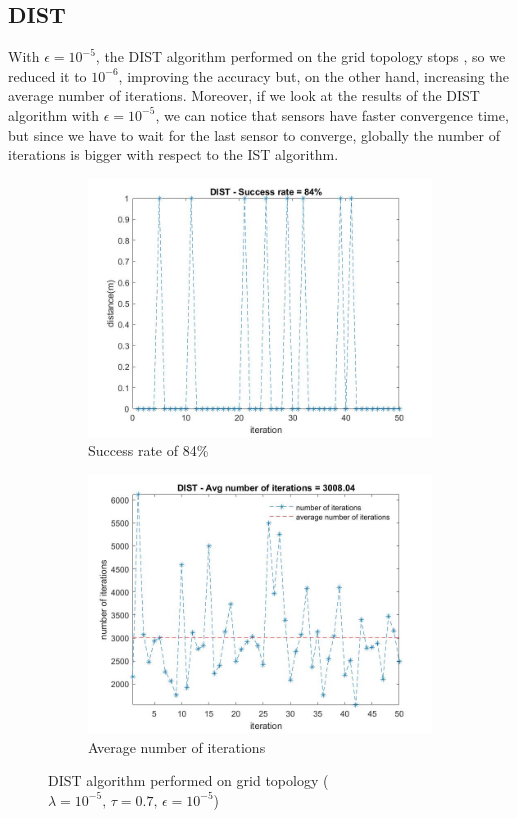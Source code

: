 \subsection{DIST}

With $\epsilon=10^{-5}$, the DIST algorithm performed on the grid topology stops , so we reduced it to $10^{-6}$, improving the accuracy
but, on the other hand, increasing the average number of iterations. Moreover, if we look at the results of 
the DIST algorithm with $\epsilon=10^{-5}$, we can notice that sensors have faster convergence time, but since we have to wait 
for the last sensor to converge, globally the number of iterations is bigger with respect to the IST algorithm.

\begin{figure}[H]
    \begin{subfigure}{0.45\textwidth}
        \centering
        \includegraphics[width=\textwidth]{img/DIST_distance_1e-4_grid.jpg}
        \caption{Success rate of 84\%}
    \end{subfigure}
    \hfill
    \begin{subfigure}{0.45\textwidth}
        \centering
        \includegraphics[width=\textwidth]{img/DIST_num_iterations_1e-4_grid.jpg}
        \caption{Average number of iterations}
    \end{subfigure}
    \caption{DIST algorithm performed on grid topology ($\lambda=10^{-5},\,\tau=0.7,\,\epsilon=10^{-5}$)}
\end{figure}
